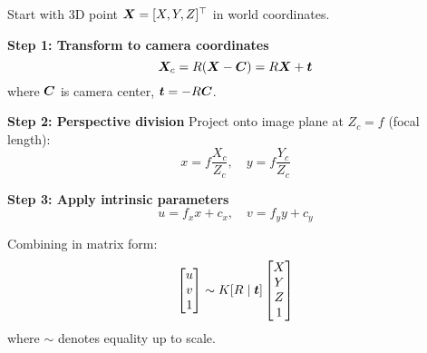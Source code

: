\begin{derivation}
	Start with 3D point $\bm{X} = [X, Y, Z]^\top$ in world coordinates.
	
	\textbf{Step 1: Transform to camera coordinates}
	\begin{equation}
		\bm{X}_c = R(\bm{X} - \bm{C}) = R\bm{X} + \bm{t}
	\end{equation}
	where $\bm{C}$ is camera center, $\bm{t} = -R\bm{C}$.
	
	\textbf{Step 2: Perspective division}
	Project onto image plane at $Z_c = f$ (focal length):
	\begin{equation}
		x = f \frac{X_c}{Z_c}, \quad y = f \frac{Y_c}{Z_c}
	\end{equation}
	
	\textbf{Step 3: Apply intrinsic parameters}
	\begin{equation}
		u = f_x x + c_x, \quad v = f_y y + c_y
	\end{equation}
	
	Combining in matrix form:
	\begin{equation}
		\begin{bmatrix} u \\ v \\ 1 \end{bmatrix} \sim K[R \mid \bm{t}] \begin{bmatrix} X \\ Y \\ Z \\ 1 \end{bmatrix}
	\end{equation}
	where $\sim$ denotes equality up to scale.
\end{derivation}

